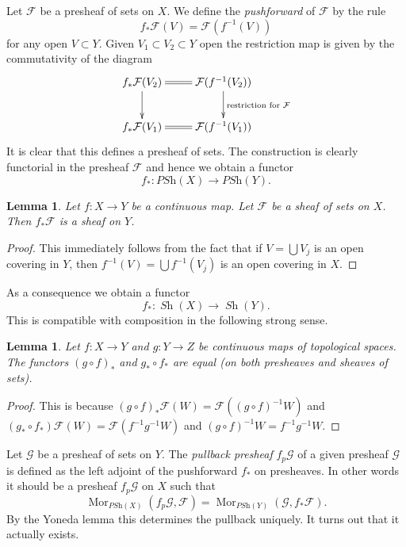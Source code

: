 \documentclass{stacks-project}
\theoremstyle{plain}
\newtheorem{lemma}[subsection]{Lemma}
\theoremstyle{definition}
\theoremstyle{remark}
\numberwithin{equation}{subsection}
\def\Mor{\mathop{\mathrm{Mor}}\nolimits}
\def\Sh{\mathop{\mathit{Sh}}\nolimits}
\begin{document}
\medskip\noindent
Let $\mathcal{F}$ be a presheaf of sets on $X$. We define the
{\it pushforward} of $\mathcal{F}$ by the rule
$$
f_*\mathcal{F}(V) = \mathcal{F}(f^{-1}(V))
$$
for any open $V \subset Y$.
Given $V_1 \subset V_2 \subset Y$ open the restriction map
is given by the commutativity of the diagram
$$
\xymatrix{
f_*\mathcal{F}(V_2) \ar[d] \ar@{=}[r] &
\mathcal{F}(f^{-1}(V_2)) \ar[d]^{\text{restriction for }\mathcal{F}} \\
f_*\mathcal{F}(V_1) \ar@{=}[r] &
\mathcal{F}(f^{-1}(V_1))
}
$$
It is clear that this defines a presheaf of sets. The construction
is clearly functorial in the presheaf $\mathcal{F}$ and hence
we obtain a functor
$$
f_* : \textit{PSh}(X) \longrightarrow \textit{PSh}(Y).
$$

\begin{lemma}
\label{lemma-pushforward-sheaf}
Let $f : X \to Y$ be a continuous map.
Let $\mathcal{F}$ be a sheaf of sets on $X$.
Then $f_*\mathcal{F}$ is a sheaf on $Y$.
\end{lemma}

\begin{proof}
This immediately follows from the fact that
if $V = \bigcup V_j$ is an open covering in $Y$,
then $f^{-1}(V) = \bigcup f^{-1}(V_j)$ is an open covering in $X$.
\end{proof}

\noindent
As a consequence we obtain a functor
$$
f_* : \Sh(X) \longrightarrow \Sh(Y).
$$
This is compatible with composition in the following
strong sense.

\begin{lemma}
\label{lemma-pushforward-composition}
Let $f : X \to Y$ and $g : Y \to Z$ be continuous maps
of topological spaces. The functors $(g \circ f)_*$
and $g_* \circ f_*$ are equal (on both presheaves
and sheaves of sets).
\end{lemma}

\begin{proof}
This is because $(g \circ f)_*\mathcal{F}(W) =
\mathcal{F}((g \circ f)^{-1}W)$ and
$(g_* \circ f_*)\mathcal{F}(W) = \mathcal{F}(f^{-1} g^{-1} W)$
and $(g \circ f)^{-1}W = f^{-1} g^{-1} W$.
\end{proof}

\noindent
Let $\mathcal{G}$ be a presheaf of sets on $Y$.
The {\it pullback presheaf} $f_p\mathcal{G}$
of a given presheaf $\mathcal{G}$ is defined as the left adjoint
of the pushforward $f_*$ on presheaves. In other words it
should be a presheaf $f_p \mathcal{G}$ on $X$ such that
$$
\Mor_{\textit{PSh}(X)}(f_p\mathcal{G}, \mathcal{F})
=
\Mor_{\textit{PSh}(Y)}(\mathcal{G}, f_*\mathcal{F}).
$$
By the Yoneda lemma this determines the pullback uniquely.
It turns out that it actually exists.
\end{document}
